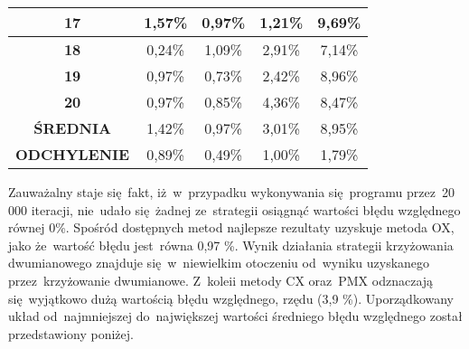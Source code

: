 \begin{itemize}
\begin{table}[h!]
\begin{center}
{\begin{tabular}{|c|c|c|c|c|}
\textbf{17}&1,57\%&0,97\%&1,21\%&9,69\% \\ \hline
\textbf{18}&0,24\%&1,09\%&2,91\%&7,14\% \\ \hline
\textbf{19}&0,97\%&0,73\%&2,42\%&8,96\% \\ \hline
\textbf{20}&0,97\%&0,85\%&4,36\%&8,47\% \\ \hline
\textbf{ŚREDNIA}&1,42\%&0,97\%&3,01\%&8,95\% \\ \hline
\textbf{ODCHYLENIE}&0,89\%&0,49\%&1,00\%&1,79\% \\ \hline
\end{tabular}}
\label{klasyczna20}
\end{center}
\end{table}

Zauważalny staje się~fakt, iż~w~przypadku wykonywania się~programu przez~20 000 iteracji, nie~udało się~żadnej ze~strategii osiągnąć wartości błędu względnego równej 0\%. Spośród dostępnych metod najlepsze rezultaty uzyskuje metoda OX, jako że~wartość błędu jest~równa 0,97 \%. Wynik działania strategii krzyżowania dwumianowego znajduje się~w~niewielkim otoczeniu od~wyniku uzyskanego przez~krzyżowanie dwumianowe. Z~koleii metody CX oraz~PMX odznaczają się~wyjątkowo dużą wartością błędu względnego, rzędu (3,9 \%). Uporządkowany układ od~najmniejszej do~największej wartości średniego błędu względnego został przedstawiony poniżej.

\begin{table}[h!]
\begin{center}
\caption{Ranking metod krzyżowania na podstawie średniej wartości błędu względnego funkcji celu, reprodukcja losowa,  mutacja DE/rand/1, 20 000 iteracji.}
\label{rankingcross1}
\end{center}
\end{table}


\end{itemize}
